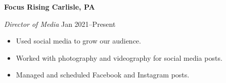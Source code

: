 \textbf{Focus Rising \hfill  Carlisle, PA} \par
\textit{Director of Media} \hfill Jan 2021--Present \par
\begin{itemize}
	\item Used social media to grow our audience.
	\item Worked with photography and videography for social media posts.
	\item Managed and scheduled Facebook and Instagram posts.
\end{itemize} \par
